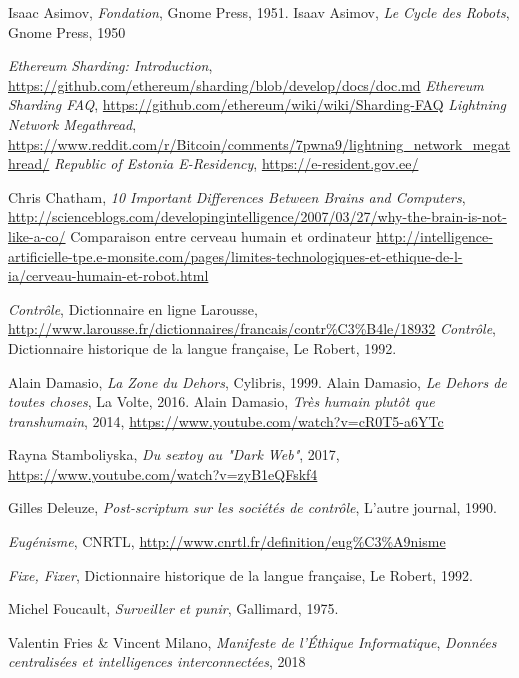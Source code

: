 \begin{thebibliography}{99}
     Isaac Asimov, \emph{Fondation}, Gnome Press, 1951.
     Isaav Asimov, \emph{Le Cycle des Robots}, Gnome Press, 1950

     \emph{Ethereum Sharding: Introduction}, \url{https://github.com/ethereum/sharding/blob/develop/docs/doc.md}
     \emph{Ethereum Sharding FAQ}, \url{https://github.com/ethereum/wiki/wiki/Sharding-FAQ}
     \emph{Lightning Network Megathread}, \url{https://www.reddit.com/r/Bitcoin/comments/7pwna9/lightning_network_megathread/}
     \emph{Republic of Estonia E-Residency}, \url{https://e-resident.gov.ee/}

     Chris Chatham, \emph{10 Important Differences Between Brains and Computers}, \url{http://scienceblogs.com/developingintelligence/2007/03/27/why-the-brain-is-not-like-a-co/}
     Comparaison entre cerveau humain et ordinateur \url{http://intelligence-artificielle-tpe.e-monsite.com/pages/limites-technologiques-et-ethique-de-l-ia/cerveau-humain-et-robot.html}
    
     \emph{Contrôle}, Dictionnaire en ligne Larousse, \url{http://www.larousse.fr/dictionnaires/francais/contr%C3%B4le/18932}
     \emph{Contrôle}, Dictionnaire historique de la langue française, Le Robert, 1992.

     Alain Damasio, \emph{La Zone du Dehors}, Cylibris, 1999.
     Alain Damasio, \emph{Le Dehors de toutes choses}, La Volte, 2016.
     Alain Damasio, \emph{Très humain plutôt que transhumain}, 2014, \url{https://www.youtube.com/watch?v=cR0T5-a6YTc}

     Rayna Stamboliyska, \emph{Du sextoy au "Dark Web"}, 2017, \url{https://www.youtube.com/watch?v=zyB1eQFskf4}

     Gilles Deleuze, \emph{Post-scriptum sur les sociétés de contrôle}, L'autre journal, 1990.

     \emph{Eugénisme}, CNRTL, \url{http://www.cnrtl.fr/definition/eug%C3%A9nisme}

     \emph{Fixe, Fixer}, Dictionnaire historique de la langue française, Le Robert, 1992. 

     Michel Foucault, \emph{Surveiller et punir}, Gallimard, 1975.

     Valentin Fries \& Vincent Milano, \emph{Manifeste de l'Éthique Informatique}, \emph{Données centralisées et intelligences interconnectées}, 2018


\end{thebibliography}
